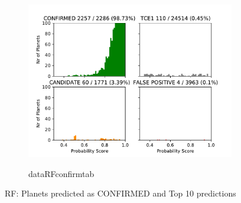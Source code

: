 \begin{figure}[H]
                \centering
                \begin{subfigure}{1\textwidth}
                \includegraphics[width = 1\textwidth]{data/RF_pred_CONFIRMED.pdf}
                \end{subfigure}
                \begin{subfigure}{1\textwidth}
                \csname dataRFconfirmtab\endcsname
                \end{subfigure}
                \caption{RF: Planets predicted as CONFIRMED and Top 10 predictions}
                \label{fig:data/RF_pred_CONFIRMED}
                \end{figure}